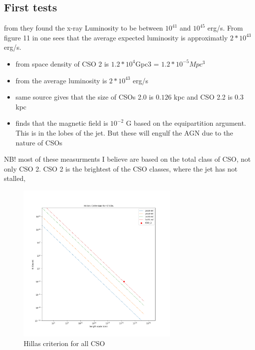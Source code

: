 \documentclass[11pt]{article}
\begin{document}
\subsection{First tests }
from \cite{bronzini2024investigating} they found the x-ray Luminosity to be between $10^{41}$ and $10^{45}$ erg/s.
From figure 11 in \cite{readhead2023compact} one sees that the average expected luminosity is approximatly $2*10^{43}$ erg/s.

\begin{itemize}
    \item from \cite{readhead2023compact} space density of CSO 2 is $1.2 * 10^4 $Gpc3 = $1.2 * 10^{-5} Mpc^3$
    \item from \cite{readhead2023compact} the average luminosity is $2*10^{43}$ erg/s
    \item same source gives that the size of CSOs 2.0 is $0.126$ kpc and CSO 2.2 is $0.3$ kpc
    \item \cite{bronzini2024investigating} finds that the magnetic field is $10^{-2}$ G based on the equipartition argument. This is in the lobes of the jet. But these will engulf the AGN due to the nature of CSOs 
\end{itemize}
NB! most of these measurments I believe are based on the total class of CSO, not only CSO 2. CSO 2 is the brightest of the CSO classes, where the jet has not stalled, \cite{readhead2023compact}

\begin{figure}
    \centering
    \includegraphics[width=0.7\textwidth]{Plots/Hillas_criterion_CSO.png}
    \caption{Hillas criterion for all CSO}
    \label{fig:Hillas_criterion_CSO}
\end{figure}
\end{document}
